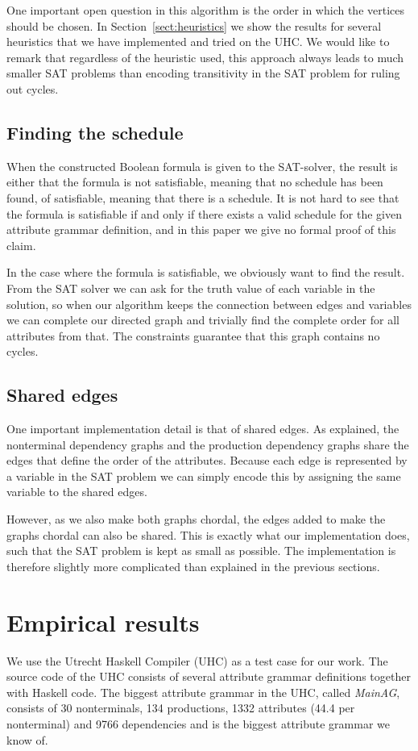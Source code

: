 \documentclass{llncs}
\newcommand{\sectref}[1]{Section~\ref{#1}}
\begin{document}
One important open question in this algorithm is the order in which the vertices should be chosen. In \sectref{sect:heuristics} we show the results for several heuristics that we have implemented and tried on the UHC. We would like to remark that regardless of the heuristic used, this approach always leads to much smaller SAT problems than encoding transitivity in the SAT problem for ruling out cycles.

\subsection{Finding the schedule}
When the constructed Boolean formula is given to the SAT-solver, the result is either that the formula is not satisfiable, meaning that no schedule has been found, of satisfiable, meaning that there is a schedule. It is not hard to see that the formula is satisfiable if and only if there exists a valid schedule for the given attribute grammar definition, and in this paper we give no formal proof of this claim.

In the case where the formula is satisfiable, we obviously want to find the result. From the SAT solver we can ask for the truth value of each variable in the solution, so when our algorithm keeps the connection between edges and variables we can complete our directed graph and trivially find the complete order for all attributes from that. The constraints guarantee that this graph contains no cycles.

\subsection{Shared edges}
One important implementation detail is that of shared edges. As explained, the nonterminal dependency graphs and the production dependency graphs share the edges that define the order of the attributes. Because each edge is represented by a variable in the SAT problem we can simply encode this by assigning the same variable to the shared edges.

However, as we also make both graphs chordal, the edges added to make the graphs chordal can also be shared. This is exactly what our implementation does, such that the SAT problem is kept as small as possible. The implementation is therefore slightly more complicated than explained in the previous sections.

\section{Empirical results} \label{sect:results}
We use the Utrecht Haskell Compiler (UHC) \cite{Dijkstra:2009} as a test case for our work. The source code of the UHC consists of several attribute grammar definitions together with Haskell code. The biggest attribute grammar in the UHC, called \emph{MainAG}, consists of 30 nonterminals, 134 productions, 1332 attributes (44.4 per nonterminal) and 9766 dependencies and is the biggest attribute grammar we know of.
\end{document}
